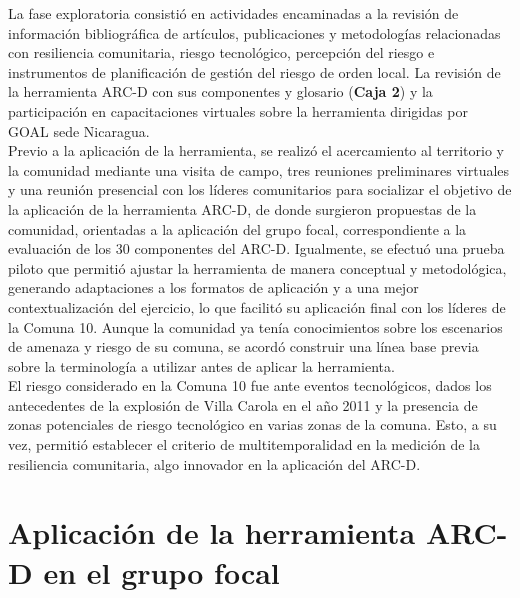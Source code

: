 \documentclass[
  letterpaper,
]{book}
\begin{document}
La fase exploratoria consistió en actividades encaminadas a la revisión
de información bibliográfica de artículos, publicaciones y metodologías
relacionadas con resiliencia comunitaria, riesgo tecnológico, percepción
del riesgo e instrumentos de planificación de gestión del riesgo de
orden local. La revisión de la herramienta ARC-D con sus componentes y
glosario (\textbf{Caja 2}) y la participación en capacitaciones
virtuales sobre la herramienta dirigidas por GOAL sede Nicaragua.\\
Previo a la aplicación de la herramienta, se realizó el acercamiento al
territorio y la comunidad mediante una visita de campo, tres reuniones
preliminares virtuales y una reunión presencial con los líderes
comunitarios para socializar el objetivo de la aplicación de la
herramienta ARC-D, de donde surgieron propuestas de la comunidad,
orientadas a la aplicación del grupo focal, correspondiente a la
evaluación de los 30 componentes del ARC-D. Igualmente, se efectuó una
prueba piloto que permitió ajustar la herramienta de manera conceptual y
metodológica, generando adaptaciones a los formatos de aplicación y a
una mejor contextualización del ejercicio, lo que facilitó su aplicación
final con los líderes de la Comuna 10. Aunque la comunidad ya tenía
conocimientos sobre los escenarios de amenaza y riesgo de su comuna, se
acordó construir una línea base previa sobre la terminología a utilizar
antes de aplicar la herramienta.\\
El riesgo considerado en la Comuna 10 fue ante eventos tecnológicos,
dados los antecedentes de la explosión de Villa Carola en el año 2011 y
la presencia de zonas potenciales de riesgo tecnológico en varias zonas
de la comuna. Esto, a su vez, permitió establecer el criterio de
multitemporalidad en la medición de la resiliencia comunitaria, algo
innovador en la aplicación del ARC-D.

\section{Aplicación de la herramienta ARC-D en el grupo
focal}\label{aplicaciuxf3n-de-la-herramienta-arc-d-en-el-grupo-focal}
\end{document}
